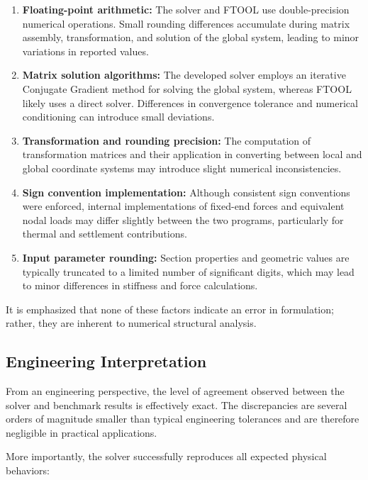 \begin{enumerate}
    \item \textbf{Floating-point arithmetic:}
    The solver and FTOOL use double-precision numerical operations. Small rounding differences accumulate during matrix assembly, transformation, and solution of the global system, leading to minor variations in reported values.

    \item \textbf{Matrix solution algorithms:}
    The developed solver employs an iterative Conjugate Gradient method for solving the global system, whereas FTOOL likely uses a direct solver. Differences in convergence tolerance and numerical conditioning can introduce small deviations.

    \item \textbf{Transformation and rounding precision:}
    The computation of transformation matrices and their application in converting between local and global coordinate systems may introduce slight numerical inconsistencies.

    \item \textbf{Sign convention implementation:}
    Although consistent sign conventions were enforced, internal implementations of fixed-end forces and equivalent nodal loads may differ slightly between the two programs, particularly for thermal and settlement contributions.

    \item \textbf{Input parameter rounding:}
    Section properties and geometric values are typically truncated to a limited number of significant digits, which may lead to minor differences in stiffness and force calculations.
\end{enumerate}

It is emphasized that none of these factors indicate an error in formulation; rather, they are inherent to numerical structural analysis.

\subsection{Engineering Interpretation}

From an engineering perspective, the level of agreement observed between the solver and benchmark results is effectively exact. The discrepancies are several orders of magnitude smaller than typical engineering tolerances and are therefore negligible in practical applications.

More importantly, the solver successfully reproduces all expected physical behaviors:

